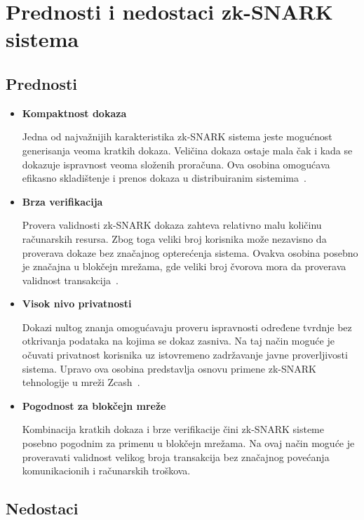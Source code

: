 \section{Prednosti i nedostaci zk-SNARK sistema}

\subsection{Prednosti}

\begin{itemize}

\item \textbf{Kompaktnost dokaza}

Jedna od najvažnijih karakteristika zk-SNARK sistema jeste mogućnost generisanja veoma kratkih dokaza. Veličina dokaza ostaje mala čak i kada se dokazuje ispravnost veoma složenih proračuna. Ova osobina omogućava efikasno skladištenje i prenos dokaza u distribuiranim sistemima~\cite{nitulescu2023snarks}.

\item \textbf{Brza verifikacija}

Provera validnosti zk-SNARK dokaza zahteva relativno malu količinu računarskih resursa. Zbog toga veliki broj korisnika može nezavisno da proverava dokaze bez značajnog opterećenja sistema. Ovakva osobina posebno je značajna u blokčejn mrežama, gde veliki broj čvorova mora da proverava validnost transakcija~\cite{nitulescu2023snarks}.

\item \textbf{Visok nivo privatnosti}

Dokazi nultog znanja omogućavaju proveru ispravnosti određene tvrdnje bez otkrivanja podataka na kojima se dokaz zasniva. Na taj način moguće je očuvati privatnost korisnika uz istovremeno zadržavanje javne proverljivosti sistema. Upravo ova osobina predstavlja osnovu primene zk-SNARK tehnologije u mreži Zcash~\cite{ganesh2020demystifying}.

\item \textbf{Pogodnost za blokčejn mreže}

Kombinacija kratkih dokaza i brze verifikacije čini zk-SNARK sisteme posebno pogodnim za primenu u blokčejn mrežama. Na ovaj način moguće je proveravati validnost velikog broja transakcija bez značajnog povećanja komunikacionih i računarskih troškova.

\end{itemize}

\subsection{Nedostaci}

